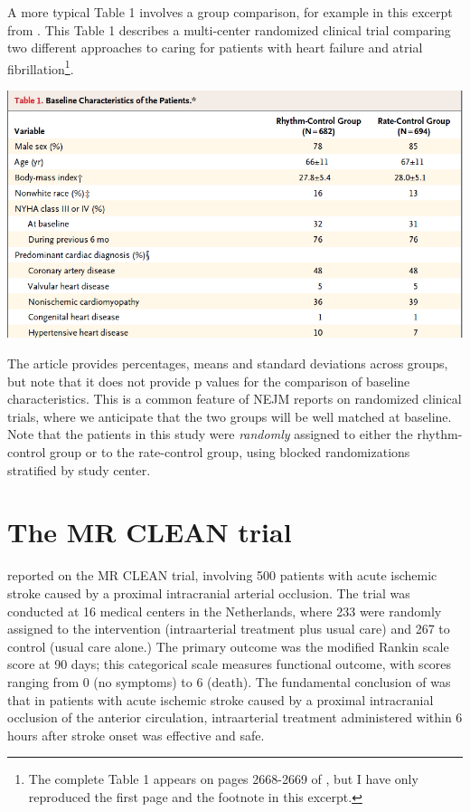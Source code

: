 \documentclass[]{book}
\let\rmarkdownfootnote\footnote%
\def\footnote{\protect\rmarkdownfootnote}
\theoremstyle{definition}
\theoremstyle{definition}
\theoremstyle{definition}
\theoremstyle{remark}
\begin{document}
A more typical Table 1 involves a group comparison, for example in this
excerpt from \citet{Roy2008}. This Table 1 describes a multi-center
randomized clinical trial comparing two different approaches to caring
for patients with heart failure and atrial fibrillation\footnote{The
  complete Table 1 appears on pages 2668-2669 of \citet{Roy2008}, but I
  have only reproduced the first page and the footnote in this excerpt.}.

\includegraphics[width=0.9\linewidth]{images/Roy-snip1}

The article provides percentages, means and standard deviations across
groups, but note that it does not provide p values for the comparison of
baseline characteristics. This is a common feature of NEJM reports on
randomized clinical trials, where we anticipate that the two groups will
be well matched at baseline. Note that the patients in this study were
\emph{randomly} assigned to either the rhythm-control group or to the
rate-control group, using blocked randomizations stratified by study
center.

\section{The MR CLEAN trial}\label{the-mr-clean-trial}

\citet{Berkhemer2015} reported on the MR CLEAN trial, involving 500
patients with acute ischemic stroke caused by a proximal intracranial
arterial occlusion. The trial was conducted at 16 medical centers in the
Netherlands, where 233 were randomly assigned to the intervention
(intraarterial treatment plus usual care) and 267 to control (usual care
alone.) The primary outcome was the modified Rankin scale score at 90
days; this categorical scale measures functional outcome, with scores
ranging from 0 (no symptoms) to 6 (death). The fundamental conclusion of
\citet{Berkhemer2015} was that in patients with acute ischemic stroke
caused by a proximal intracranial occlusion of the anterior circulation,
intraarterial treatment administered within 6 hours after stroke onset
was effective and safe.
\end{document}
